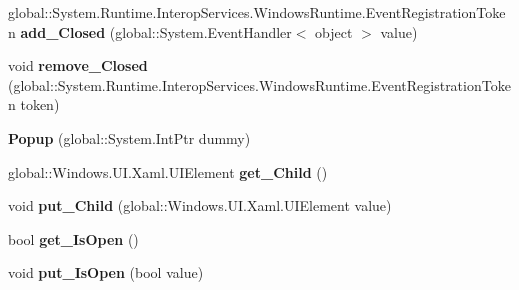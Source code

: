 \begin{DoxyCompactItemize}
global\+::\+System.\+Runtime.\+Interop\+Services.\+Windows\+Runtime.\+Event\+Registration\+Token {\bfseries add\+\_\+\+Closed} (global\+::\+System.\+Event\+Handler$<$ object $>$ value)
\item 
\mbox{\label{class_windows_1_1_u_i_1_1_xaml_1_1_controls_1_1_primitives_1_1_popup_a6296c37154aa1e45ab4075199c3672ed}} 
void {\bfseries remove\+\_\+\+Closed} (global\+::\+System.\+Runtime.\+Interop\+Services.\+Windows\+Runtime.\+Event\+Registration\+Token token)
\item 
\mbox{\label{class_windows_1_1_u_i_1_1_xaml_1_1_controls_1_1_primitives_1_1_popup_a4eb29b9974f43030c2c16d2c04ff7121}} 
{\bfseries Popup} (global\+::\+System.\+Int\+Ptr dummy)
\item 
\mbox{\label{class_windows_1_1_u_i_1_1_xaml_1_1_controls_1_1_primitives_1_1_popup_ae0a14f98eaf6c2db22f78c0eb540c36f}} 
global\+::\+Windows.\+U\+I.\+Xaml.\+U\+I\+Element {\bfseries get\+\_\+\+Child} ()
\item 
\mbox{\label{class_windows_1_1_u_i_1_1_xaml_1_1_controls_1_1_primitives_1_1_popup_a59a124fba4b518e1cbd3eb75d64476cf}} 
void {\bfseries put\+\_\+\+Child} (global\+::\+Windows.\+U\+I.\+Xaml.\+U\+I\+Element value)
\item 
\mbox{\label{class_windows_1_1_u_i_1_1_xaml_1_1_controls_1_1_primitives_1_1_popup_a5a40e3cb4731adefc4b10d02ddf2f333}} 
bool {\bfseries get\+\_\+\+Is\+Open} ()
\item 
\mbox{\label{class_windows_1_1_u_i_1_1_xaml_1_1_controls_1_1_primitives_1_1_popup_a00b5ecaf18b7393169b9e446d9047b66}} 
void {\bfseries put\+\_\+\+Is\+Open} (bool value)
\item 
\mbox{\label{class_windows_1_1_u_i_1_1_xaml_1_1_controls_1_1_primitives_1_1_popup_aeca30f18059cce5584174e60642efeb4}} 

\end{DoxyCompactItemize}
